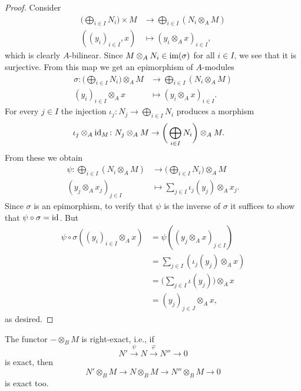 \begin{proof}
    Consider
    \begin{align*}
        \bigg(\bigoplus_{i\in I} N_i\bigg)\times M
            &\to \bigoplus_{i\in I}(N_i\otimes_AM)\\
        ((y_i)_{i\in I},x)&\mapsto (y_i\otimes_Ax)_{i\in I},
    \end{align*}
    which is clearly $A$-bilinear. Since $M\otimes_AN_i\in\text{\rm im}(\sigma)$ for all $i\in I$, we see that it is surjective. From this map we get an epimorphism of $A$-modules
    \begin{align*}
        \sigma\colon\bigg(\bigoplus_{i\in I}N_i\bigg)\otimes_AM 
            &\to \bigoplus_{i\in I}(N_i\otimes_AM)\\
        (y_i)_{i\in I}\otimes_A x&\mapsto(y_i\otimes_Ax)_{i\in I}.
    \end{align*}
    For every $j\in I$ the injection $\iota_j\colon N_j\to\bigoplus_{i\in I}N_i$ produces a morphism
    \begin{align*}
        \iota_j\otimes_A\text{\rm id}_M\colon N_j\otimes_AM
            &\to\bigg(\bigoplus_{i\in I}N_i\bigg)\otimes_AM.
    \end{align*}
    From these we obtain
    \begin{align*}
        \psi\colon\bigoplus_{i\in I}(N_i\otimes_AM)
            &\to\bigg(\bigoplus_{i\in I}N_i\bigg)\otimes_AM\\
        (y_j\otimes_Ax_j)_{j\in I}
            &\mapsto \sum_{j\in I}\iota_j(y_j)\otimes_Ax_j.
    \end{align*}
    Since $\sigma$ is an epimorphism, to verify that $\psi$ is the inverse of $\sigma$ it suffices to show that $\psi\circ\sigma=\text{\rm id}$. But
    \begin{align*}
        \psi\circ\sigma((y_i)_{i\in I}\otimes_Ax)
            &= \psi((y_j\otimes_Ax)_{j\in I})\\
            &= \sum_{j\in I}(\iota_j(y_j)\otimes_Ax)\\
            &= \Big(\sum_{j\in I}\iota(y_j)\Big)\otimes_Ax\\
            &= (y_j)_{j\in J}\otimes_Ax,
    \end{align*}
    as desired.
\end{proof}

\begin{prop}\label{prop:tensor-right-exact}
    The functor $-\otimes_BM$ is right-exact, i.e., if 
    $$
        N'\stackrel{\psi}\to N\stackrel{\varphi}\to N''\to0
    $$
    is exact, then
    $$
        N'\otimes_BM\to N\otimes_BM\to N''\otimes_BM\to0
    $$
    is exact too.
\end{prop}

